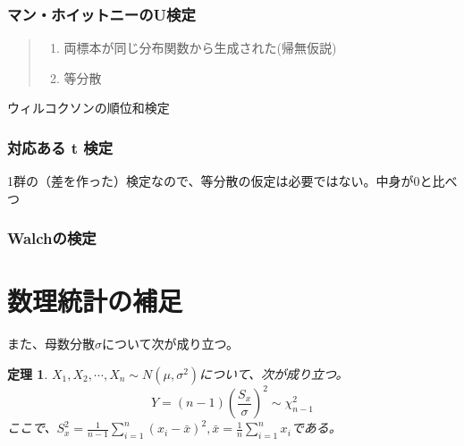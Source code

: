 \documentclass[a4paper,11pt,dvipdfmx]{jsarticle}
\newtheorem{theo}{定理}[section]
\begin{document}




\subsubsection{マン・ホイットニーのU検定}
\begin{quote}
    \begin{enumerate}[(1)]
\item 両標本が同じ分布関数から生成された(帰無仮説)
\item 等分散
\end{enumerate}
\end{quote}
ウィルコクソンの順位和検定



\subsubsection{対応ある t 検定}
1群の（差を作った）検定なので、等分散の仮定は必要ではない。中身が0と比べつ


\subsubsection{Walchの検定}



\section{数理統計の補足}

      

また、母数分散$\sigma$について次が成り立つ。
\begin{theo}\label{normal_sigma_chi2}
    $X_1,X_2,\cdots,X_n \sim N(\mu,\sigma^2)$について、次が成り立つ。
    \begin{equation*}
        Y = (n-1)(\frac{S_x}{\sigma})^2 \sim \chi^2_{n-1}
    \end{equation*}
    ここで、$S^2_x=\frac{1}{n-1}\sum_{i=1}^n(x_i-\bar{x})^2,\bar{x}=\frac{1}{n}\sum_{i=1}^n x_i$である。
\end{theo}
\end{document}

